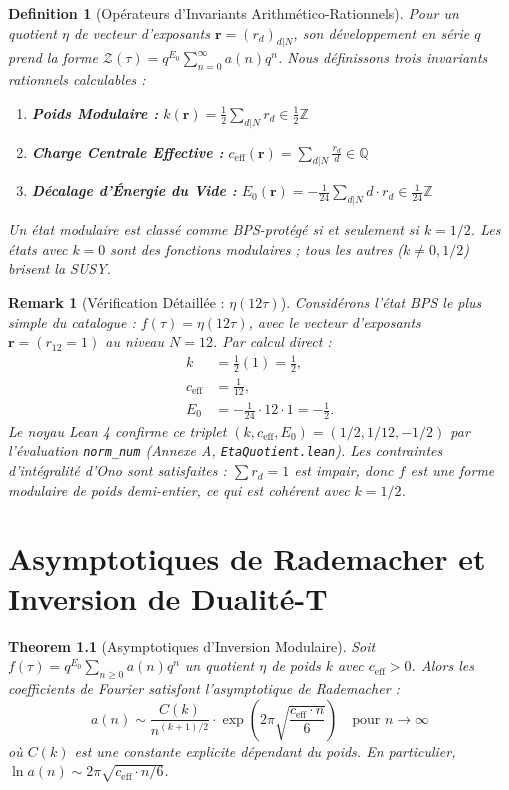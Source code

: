 \documentclass[11pt,twoside,openright]{book}
\newtheorem{theorem}{Theorem}[chapter]
\newtheorem{definition}{Definition}[chapter]
\newtheorem{remark}{Remark}[chapter]
\begin{document}
\begin{definition}[Opérateurs d'Invariants Arithmético-Rationnels]\label{def:invariants}
Pour un quotient $\eta$ de vecteur d'exposants $\mathbf{r} = (r_d)_{d|N}$, son développement en série $q$ prend la forme $\mathcal{Z}(\tau) = q^{E_0} \sum_{n=0}^\infty a(n) q^n$. Nous définissons trois invariants rationnels calculables :
\begin{enumerate}
\item \textbf{Poids Modulaire :} $\displaystyle k(\mathbf{r}) = \frac{1}{2} \sum_{d|N} r_d \in \frac{1}{2}\mathbb{Z}$
\item \textbf{Charge Centrale Effective :} $\displaystyle c_{\text{eff}}(\mathbf{r}) = \sum_{d|N} \frac{r_d}{d} \in \mathbb{Q}$
\item \textbf{Décalage d'Énergie du Vide :} $\displaystyle E_0(\mathbf{r}) = -\frac{1}{24} \sum_{d|N} d \cdot r_d \in \frac{1}{24}\mathbb{Z}$
\end{enumerate}
Un état modulaire est classé comme \emph{BPS-protégé} si et seulement si $k = 1/2$. Les états avec $k = 0$ sont des fonctions modulaires ; tous les autres ($k \neq 0, 1/2$) brisent la SUSY.
\end{definition}

\begin{remark}[Vérification Détaillée : $\eta(12\tau)$]\label{rem:worked}
Considérons l'état BPS le plus simple du catalogue : $f(\tau) = \eta(12\tau)$, avec le vecteur d'exposants $\mathbf{r} = (r_{12} = 1)$ au niveau $N = 12$. Par calcul direct :
\begin{align*}
k &= \tfrac{1}{2}(1) = \tfrac{1}{2}, \\
c_{\text{eff}} &= \tfrac{1}{12}, \\
E_0 &= -\tfrac{1}{24} \cdot 12 \cdot 1 = -\tfrac{1}{2}.
\end{align*}
Le noyau Lean 4 confirme ce triplet $(k, c_{\text{eff}}, E_0) = (1/2, 1/12, -1/2)$ par l'évaluation \texttt{norm\_num} (Annexe A, \texttt{EtaQuotient.lean}). Les contraintes d'intégralité d'Ono sont satisfaites : $\sum r_d = 1$ est impair, donc $f$ est une forme modulaire de poids demi-entier, ce qui est cohérent avec $k = 1/2$.
\end{remark}

\chapter{Asymptotiques de Rademacher et Inversion de Dualité-T}

\begin{theorem}[Asymptotiques d'Inversion Modulaire]\label{thm:rademacher}
Soit $f(\tau) = q^{E_0} \sum_{n \geq 0} a(n) q^n$ un quotient $\eta$ de poids $k$ avec $c_{\text{eff}} > 0$. Alors les coefficients de Fourier satisfont l'asymptotique de Rademacher :
\[ a(n) \sim \frac{C(k)}{n^{(k+1)/2}} \cdot \exp\!\left(2\pi \sqrt{\frac{c_{\text{eff}} \cdot n}{6}}\right) \quad \text{pour } n \to \infty \]
où $C(k)$ est une constante explicite dépendant du poids. En particulier, $\ln a(n) \sim 2\pi \sqrt{c_{\text{eff}} \cdot n / 6}$.
\end{theorem}
\end{document}
